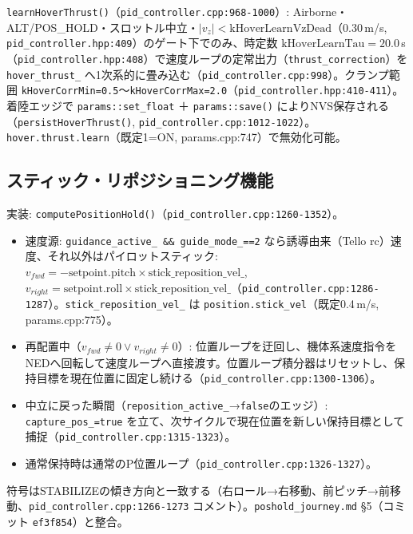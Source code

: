 \documentclass[a4paper,10pt]{ltjsarticle}
\begin{document}
\texttt{learnHoverThrust()}（\texttt{pid\_controller.cpp:968-1000}）: Airborne・ALT/POS\_HOLD・スロットル中立・$|v_z| < \mathrm{kHoverLearnVzDead}$（0.30\,m/s, \texttt{pid\_controller.hpp:409}）のゲート下でのみ、時定数 $\mathrm{kHoverLearnTau} = 20.0$\,s（\texttt{pid\_controller.hpp:408}）で速度ループの定常出力（\texttt{thrust\_correction}）を \texttt{hover\_thrust\_} へ1次系的に畳み込む（\texttt{pid\_controller.cpp:998}）。クランプ範囲 \texttt{kHoverCorrMin=0.5}〜\texttt{kHoverCorrMax=2.0}（\texttt{pid\_controller.hpp:410-411}）。着陸エッジで \texttt{params::set\_float} ＋ \texttt{params::save()} によりNVS保存される（\texttt{persistHoverThrust()}, \texttt{pid\_controller.cpp:1012-1022}）。\texttt{hover.thrust.learn}（既定1=ON, params.cpp:747）で無効化可能。

\subsection{スティック・リポジショニング機能}

実装: \texttt{computePositionHold()}（\texttt{pid\_controller.cpp:1260-1352}）。

\begin{itemize}[leftmargin=*]
  \item 速度源: \texttt{guidance\_active\_ \&\& guide\_mode\_==2} なら誘導由来（Tello rc）速度、それ以外はパイロットスティック: $v_{fwd} = -\mathrm{setpoint.pitch} \times \mathrm{stick\_reposition\_vel\_}$, $v_{right} = \mathrm{setpoint.roll} \times \mathrm{stick\_reposition\_vel\_}$（\texttt{pid\_controller.cpp:1286-1287}）。\texttt{stick\_reposition\_vel\_} は \texttt{position.stick\_vel}（既定0.4\,m/s, params.cpp:775）。
  \item 再配置中（$v_{fwd} \neq 0 \lor v_{right} \neq 0$）: 位置ループを迂回し、機体系速度指令をNEDへ回転して速度ループへ直接渡す。位置ループ積分器はリセットし、保持目標を現在位置に固定し続ける（\texttt{pid\_controller.cpp:1300-1306}）。
  \item 中立に戻った瞬間（\texttt{reposition\_active\_}→\texttt{false}のエッジ）: \texttt{capture\_pos\_=true} を立て、次サイクルで現在位置を新しい保持目標として捕捉（\texttt{pid\_controller.cpp:1315-1323}）。
  \item 通常保持時は通常のP位置ループ（\texttt{pid\_controller.cpp:1326-1327}）。
\end{itemize}

符号はSTABILIZEの傾き方向と一致する（右ロール→右移動、前ピッチ→前移動、\texttt{pid\_controller.cpp:1266-1273} コメント）。\texttt{poshold\_journey.md} §5（コミット \texttt{ef3f854}）と整合。
\end{document}
